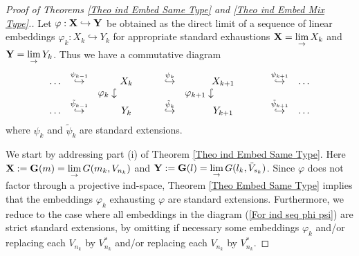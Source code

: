 \documentclass[12pt]{amsart}
\def\hw  {\hookrightarrow}
\newcommand{\hdw}{\mathrel{\rotatebox[origin=c]{-90}{$\hookrightarrow$}}}
\begin{document}
\begin{proof}[Proof of Theorems \ref{Theo ind Embed Same Type} and \ref{Theo ind Embed Mix Type}.]
Let $\varphi:{\bf X}\hw {\bf Y}$ be obtained as the direct limit of a sequence of linear embeddings $\varphi_k:X_k\hw Y_k$ for appropriate standard exhaustions ${\bf X}=\lim\limits_\to X_k$ and ${\bf Y}=\lim\limits_\to Y_k$. Thus we have a commutative diagram
\begin{gather}\label{For ind seq phi psi}
\begin{array}{ccccccc}
\dots & \stackrel{\psi_{k-1}}{\hw} & X_k & \stackrel{\psi_k}{\hw} & X_{k+1} & \stackrel{\psi_{k+1}}{\hw} & \dots \\
 &  & \varphi_{k}\hdw\qquad\qquad &  & \varphi_{k+1}\hdw\qquad\qquad\quad &  & \\
\dots & \stackrel{\tilde\psi_{k-1}}{\hw} & Y_k & \stackrel{\tilde\psi_k}{\hw} & Y_{k+1} & \stackrel{\tilde\psi_{k+1}}{\hw} & \dots
\end{array}
\end{gather}
where $\psi_k$ and $\tilde\psi_k$ are standard extensions.

We start by addressing part (i) of Theorem \ref{Theo ind Embed Same Type}. Here ${\bf X}:={\bf G}(m)=\lim\limits_{\to} G(m_k,V_{n_k})$ and ${\bf Y}:={\bf G}(l)=\lim\limits_{\to} G(l_k,\tilde V_{s_k})$. Since $\varphi$ does not factor through a projective ind-space, Theorem \ref{Theo Embed Same Type} implies that the embeddings $\varphi_k$ exhausting $\varphi$ are standard extensions. Furthermore, we reduce to the case where all embeddings in the diagram (\ref{For ind seq phi psi}) are strict standard extensions, by omitting if necessary some embeddings $\varphi_k$ and/or replacing each $V_{n_k}$ by $V_{n_k}^*$ and/or replacing each $V_{n_k}$ by $V_{n_k}^*$.


\end{proof}
\end{document}
